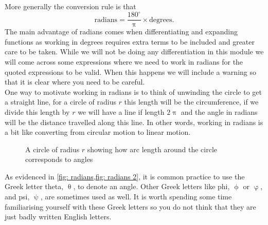 More generally the conversion rule is that
\begin{equation*}
\text{radians} = \frac{180^{\circ}}{\uppi}\times \text{degrees}.
\end{equation*}
The main advantage of radians comes when differentiating and expanding functions as working in degrees requires extra terms to be included and greater care to be taken. While we will not be doing any differentiation in this module we will come across some expressions where we need to work in radians for the quoted expressions to be valid. When this happens we will include a warning so that it is clear where you need to be careful.\\

One way to motivate working in radians is to think of unwinding the circle to get a straight line, for a circle of radius $r$ this length will be the circumference, if we divide this length by $r$ we will have a line if length $2\uppi$ and the angle in radians will be the distance travelled along this line. In other words, working in radians is a bit like converting from circular motion to linear motion.

\begin{figure}[ht]
    \centering
    \caption{A circle of radius $r$ showing how arc length around the circle corresponds to angles}
        \label{fig: radians 2}
\end{figure}

As evidenced in \cref{fig: radians,fig: radians 2}, it is common practice to use the Greek letter theta, $\uptheta$, to denote an angle. Other Greek letters like phi, $\upphi$ or $\upvarphi$, and psi, $\uppsi$, are sometimes used as well. It is worth spending some time familiarising yourself with these Greek letters so you do not think that they are just badly written English letters.

